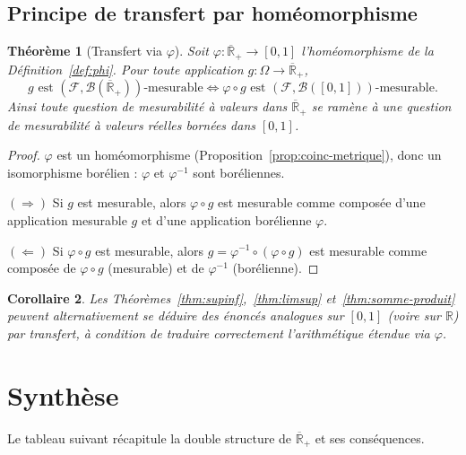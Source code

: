 \documentclass[11pt,a4paper]{article}
\theoremstyle{plain}
\newtheorem{theorem}{Théorème}[section]
\newtheorem{corollary}[theorem]{Corollaire}
\theoremstyle{definition}
\newcommand{\R}{\mathbb{R}}
\newcommand{\Rpb}{\overline{\mathbb{R}}_+}
\newcommand{\B}{\mathcal{B}}
\newcommand{\F}{\mathcal{F}}
\begin{document}
\subsection{Principe de transfert par homéomorphisme}

\begin{theorem}[Transfert via $\varphi$]\label{thm:transfert}
Soit $\varphi:\Rpb\to[0,1]$ l'homéomorphisme de la Définition~\ref{def:phi}.
Pour toute application $g:\Omega\to\Rpb$,
\[
g\text{ est }(\F,\B(\Rpb))\text{-mesurable}
\iff
\varphi\circ g\text{ est }(\F,\B([0,1]))\text{-mesurable}.
\]
Ainsi toute question de mesurabilité à valeurs dans $\Rpb$ se ramène à une
question de mesurabilité à valeurs réelles bornées dans $[0,1]$.
\end{theorem}

\begin{proof}
$\varphi$ est un homéomorphisme (Proposition~\ref{prop:coinc-metrique}), donc
un isomorphisme borélien : $\varphi$ et $\varphi^{-1}$ sont boréliennes.

$(\Rightarrow)$ Si $g$ est mesurable, alors $\varphi\circ g$ est mesurable comme
composée d'une application mesurable $g$ et d'une application borélienne
$\varphi$.

$(\Leftarrow)$ Si $\varphi\circ g$ est mesurable, alors
$g=\varphi^{-1}\circ(\varphi\circ g)$ est mesurable comme composée de
$\varphi\circ g$ (mesurable) et de $\varphi^{-1}$ (borélienne).
\end{proof}

\begin{corollary}
Les Théorèmes~\ref{thm:supinf},~\ref{thm:limsup} et~\ref{thm:somme-produit}
peuvent alternativement se déduire des énoncés analogues sur $[0,1]$ (voire sur
$\R$) par transfert, à condition de traduire correctement l'arithmétique
étendue via $\varphi$.
\end{corollary}

\section{Synthèse}

Le tableau suivant récapitule la double structure de $\Rpb$ et ses
conséquences.
\end{document}
